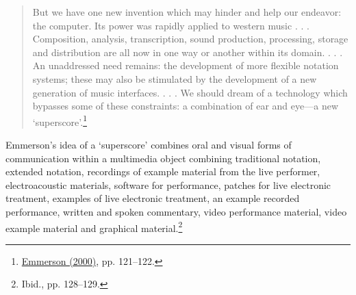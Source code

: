 \begin{quote}
But we have one new invention which may hinder and help our endeavor: the computer. Its power was rapidly applied to western music . . . Composition, analysis, transcription, sound production, processing, storage and distribution are all now in one way or another within its domain. . . . An unaddressed need remains: the development of more flexible notation systems; these may also be stimulated by the development of a new generation of music interfaces. . . . We should dream of a technology which bypasses some of these constraints: a combination of ear and eye---a new `superscore'.\footnote{\hyperlink{emmersoncross}{Emmerson (2000)}, pp. 121--122.} 
\end{quote}
Emmerson's idea of a `superscore' combines oral and visual forms of communication within a multimedia object combining traditional notation, extended notation, recordings of example material from the live performer, electroacoustic materials, software for performance, patches for live electronic treatment, examples of live electronic treatment, an example recorded performance, written and spoken commentary, video performance material, video example material and graphical material.\footnote{Ibid., pp. 128--129.} 

